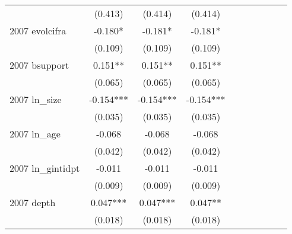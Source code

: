 \begin{table}[htbp]
\begin{tabular}{l*{9}{c}}
                    &     (0.413)   &     (0.414)   &     (0.414)   &               &               &               &               &               &               \\
2007 evolcifra      &      -0.180*  &      -0.181*  &      -0.181*  &               &               &               &               &               &               \\
                    &     (0.109)   &     (0.109)   &     (0.109)   &               &               &               &               &               &               \\
2007 bsupport       &       0.151** &       0.151** &       0.151** &               &               &               &               &               &               \\
                    &     (0.065)   &     (0.065)   &     (0.065)   &               &               &               &               &               &               \\
2007 ln\_size        &      -0.154***&      -0.154***&      -0.154***&               &               &               &               &               &               \\
                    &     (0.035)   &     (0.035)   &     (0.035)   &               &               &               &               &               &               \\
2007 ln\_age         &      -0.068   &      -0.068   &      -0.068   &               &               &               &               &               &               \\
                    &     (0.042)   &     (0.042)   &     (0.042)   &               &               &               &               &               &               \\
2007 ln\_gintidpt    &      -0.011   &      -0.011   &      -0.011   &               &               &               &               &               &               \\
                    &     (0.009)   &     (0.009)   &     (0.009)   &               &               &               &               &               &               \\
2007 depth          &       0.047***&       0.047***&       0.047** &               &               &               &               &               &               \\
                    &     (0.018)   &     (0.018)   &     (0.018)   &               &               &               &               &               &               \\

\end{tabular}
\end{table}
